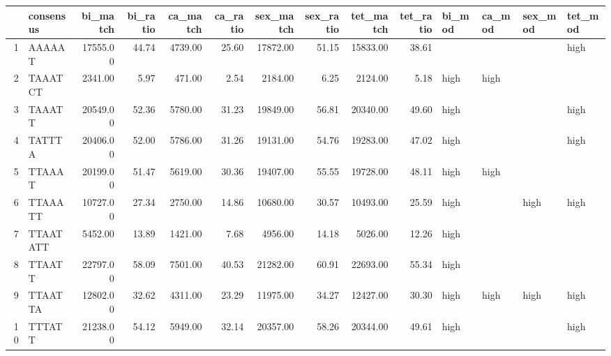 \begin{table}[!ht]
\centering
\begin{tabular}{rlrrrrrrrrllll}
  \hline
 & consensus & bi\_match & bi\_ratio & ca\_match & ca\_ratio & sex\_match & sex\_ratio & tet\_match & tet\_ratio & bi\_mod & ca\_mod & sex\_mod & tet\_mod \\ 
  \hline
1 & AAAAAT & 17555.00 & 44.74 & 4739.00 & 25.60 & 17872.00 & 51.15 & 15833.00 & 38.61 &  &  &  & high \\ 
  2 & TAAATCT & 2341.00 & 5.97 & 471.00 & 2.54 & 2184.00 & 6.25 & 2124.00 & 5.18 & high & high &  &  \\ 
  3 & TAAATT & 20549.00 & 52.36 & 5780.00 & 31.23 & 19849.00 & 56.81 & 20340.00 & 49.60 & high &  &  & high \\ 
  4 & TATTTA & 20406.00 & 52.00 & 5786.00 & 31.26 & 19131.00 & 54.76 & 19283.00 & 47.02 & high &  &  & high \\ 
  5 & TTAAAT & 20199.00 & 51.47 & 5619.00 & 30.36 & 19407.00 & 55.55 & 19728.00 & 48.11 & high & high &  &  \\ 
  6 & TTAAATT & 10727.00 & 27.34 & 2750.00 & 14.86 & 10680.00 & 30.57 & 10493.00 & 25.59 & high &  & high & high \\ 
  7 & TTAATATT & 5452.00 & 13.89 & 1421.00 & 7.68 & 4956.00 & 14.18 & 5026.00 & 12.26 & high &  &  &  \\ 
  8 & TTAATT & 22797.00 & 58.09 & 7501.00 & 40.53 & 21282.00 & 60.91 & 22693.00 & 55.34 & high &  &  &  \\ 
  9 & TTAATTA & 12802.00 & 32.62 & 4311.00 & 23.29 & 11975.00 & 34.27 & 12427.00 & 30.30 & high & high & high & high \\ 
  10 & TTTATT & 21238.00 & 54.12 & 5949.00 & 32.14 & 20357.00 & 58.26 & 20344.00 & 49.61 & high &  &  & high \\ 
   \hline
\end{tabular}
\end{table}
